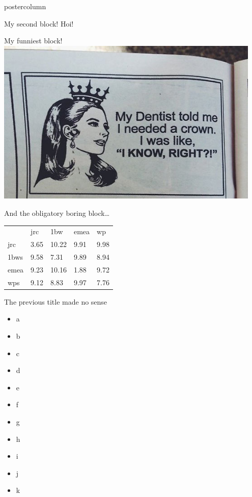 \documentclass[roundedcorners=true, titleposition=left]{beamerthemeruhuisstijlposter}
\begin{document}
\begin{frame}
\begin{columns}
\begin{column}{0.49\textwidth}
\begin{beamercolorbox}[center, wd=\textwidth]{postercolumn}
\begin{minipage}[T]{0.95\textwidth}
\parbox[t][\columnheight]{\textwidth}{%
  \begin{block}{My second block!}
  	Hoi!
  \end{block}
  \medskip
  \begin{block}{My funniest block!}
  	\includegraphics[width=0.95\textwidth]{funnygirl}
  \end{block}
  \medskip
  \begin{block}{And the obligatory boring block\ldots}
  	\begin{tabular}{lllll}
           & jrc  & 1bw   & emea & wp   \\
      jrc  & 3.65 & 10.22 & 9.91 & 9.98 \\
      1bws & 9.58 & 7.31  & 9.89 & 8.94 \\
      emea & 9.23 & 10.16 & 1.88 & 9.72 \\
      wps  & 9.12 & 8.83  & 9.97 & 7.76 \\
    \end{tabular}
  \end{block}
  \medskip
  \begin{block}{The previous title made no sense}
  	\begin{itemize}
    	\item a
        \item b
        \item c
        \item d
        \item e
        \item f
        \item g
        \item h
        \item i
        \item j
        \item k
    \end{itemize}
  \end{block}
}
\end{minipage}
\end{beamercolorbox}
\end{column}
\end{columns}
\end{frame}
\end{document}
